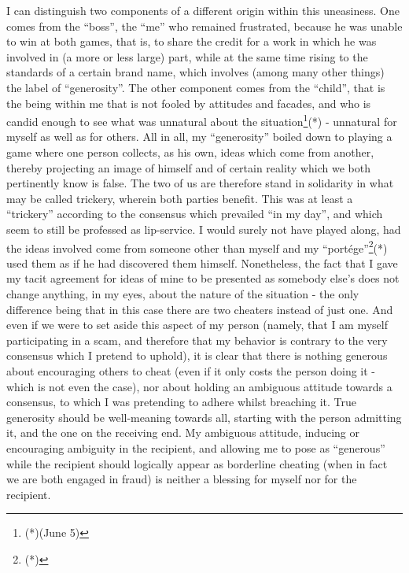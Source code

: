 I can distinguish two components of a different origin within this uneasiness. One comes
from the ``boss'', the ``me'' who remained frustrated, because he was unable to win at
both games, that is, to share the credit for a work in which he was involved in (a more or
less large) part, while at the same time rising to the standards of a certain brand name,
which involves (among many other things) the label of ``generosity''.
The other component comes from the ``child'', that is the being within me that is not
fooled by attitudes and facades, and who is candid enough to see 
what was unnatural about the situation\footnote{(*)(June 5)}(*) - unnatural for myself 
as well as for others. 
All in all, my ``generosity'' boiled down to playing a game where one person collects, as
his own, ideas which come from another, thereby projecting an image of himself and of
certain reality which we both pertinently know is false. 
The two of us are therefore stand in solidarity in what may be called trickery, wherein
both parties benefit.
This was at least a ``trickery'' according to the consensus which prevailed ``in my
day'', and which seem to still be professed as lip-service.
I would surely not have played along, had the ideas involved come from someone other than
myself and my ``port\'ege''\footnote{(*)}(*) used them as if he had discovered them
himself. 
Nonetheless, the fact that I gave my tacit agreement for ideas of mine to be presented as
somebody else's does not change anything, in my eyes, about the nature of the situation -
the only difference being that in this case there are two cheaters instead of just one. 
And even if we were to set aside this aspect of my person (namely, that I am myself
participating in a scam, and therefore that my behavior is contrary to the very consensus
which I pretend to uphold), it is clear that there is nothing generous about encouraging
others to cheat (even if it only costs the person doing it - which is not even the case), 
nor about holding an ambiguous attitude towards a consensus, to which I was pretending to
adhere whilst breaching it. True generosity should be well-meaning towards all, starting
with the person admitting it, and the one on the receiving end. My ambiguous attitude,
inducing or encouraging ambiguity in the recipient, and allowing me to pose as ``generous''
while the recipient should logically appear as borderline cheating (when in fact we
are both engaged in fraud) is neither a blessing for myself nor for the recipient.

